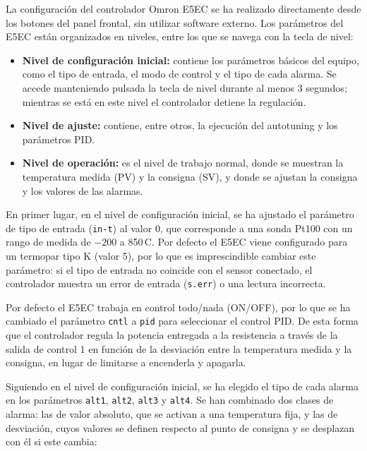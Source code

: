 
La configuración del controlador Omron E5EC se ha realizado directamente desde los botones del panel frontal, sin utilizar software externo. Los parámetros del E5EC están organizados en niveles, entre los que se navega con la tecla de nivel:

\begin{itemize}
	\item \textbf{Nivel de configuración inicial:} contiene los parámetros básicos del equipo, como el tipo de entrada, el modo de control y el tipo de cada alarma. Se accede manteniendo pulsada la tecla de nivel durante al menos 3 segundos; mientras se está en este nivel el controlador detiene la regulación.
	\item \textbf{Nivel de ajuste:} contiene, entre otros, la ejecución del autotuning y los parámetros PID.
	\item \textbf{Nivel de operación:} es el nivel de trabajo normal, donde se muestran la temperatura medida (PV) y la consigna (SV), y donde se ajustan la consigna y los valores de las alarmas.
\end{itemize}


En primer lugar, en el nivel de configuración inicial, se ha ajustado el parámetro de tipo de entrada (\texttt{in-t}) al valor 0, que corresponde a una sonda Pt100 con un rango de medida de $-200$ a 850\,\textdegree C. Por defecto el E5EC viene configurado para un termopar tipo K (valor 5), por lo que es imprescindible cambiar este parámetro: si el tipo de entrada no coincide con el sensor conectado, el controlador muestra un error de entrada (\texttt{s.err}) o una lectura incorrecta.


Por defecto el E5EC trabaja en control todo/nada (ON/OFF), por lo que se ha cambiado el parámetro \texttt{cntl} a \texttt{pid} para seleccionar el control PID. De esta forma que el controlador regula la potencia entregada a la resistencia a través de la salida de control 1 en función de la desviación entre la temperatura medida y la consigna, en lugar de limitarse a encenderla y apagarla.


Siguiendo en el nivel de configuración inicial, se ha elegido el tipo de cada alarma en los parámetros \texttt{alt1}, \texttt{alt2}, \texttt{alt3} y \texttt{alt4}. Se han combinado dos clases de alarma: las de valor absoluto, que se activan a una temperatura fija, y las de desviación, cuyos valores se definen respecto al punto de consigna y se desplazan con él si este cambia:

